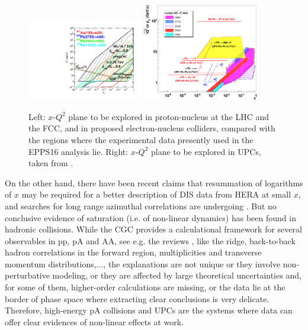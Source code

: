 \documentclass[../report.tex]{subfiles}
\begin{document}
\begin{figure}[htb]
\centering
\includegraphics[width=0.45\textwidth]{figs/FHC7_3.pdf} \hfill \includegraphics[width=0.45\textwidth]{figs/upc_lhc_x_Q_map_5.eps}
\caption{Left: $x$-$Q^2$ plane to be explored in proton-nucleus at the LHC and the FCC, and in  proposed electron-nucleus colliders, compared with the regions where the experimental data presently used in the EPPS16 analysis \cite{Eskola:2016oht} lie. Right: $x$-$Q^2$ plane to be explored in UPCs, taken from \cite{Baltz:2007kq}.}
\label{fig:smallx1}
\end{figure}

On the other hand, there have been recent claims \cite{Ball:2017otu,Abdolmaleki:2018jln} that resummation of logarithms of $x$ may be required for a better description of DIS data from HERA at small $x$, and searches for long range azimuthal correlations are undergoing \cite{zeusichep2018}. But no conclusive evidence of saturation (i.e. of non-linear dynamics) has been found in hadronic collisions. While the CGC provides a calculational framework for several observables in pp, pA and AA, see e.g. the reviews \cite{Albacete:2013tpa,Lappi:2015jka}, like the ridge, back-to-back hadron correlations in the forward region, multiplicities and transverse momentum distributions,$\dots$,  the explanations are not unique or they involve non-perturbative modeling, or they are affected by large theoretical uncertainties and, for some of them, higher-order calculations are missing, or the data lie at the border of phase space where extracting clear conclusions is very delicate. Therefore, high-energy pA collisions and UPCs are the systems where data can offer clear evidences of non-linear effects at work.
\end{document}
